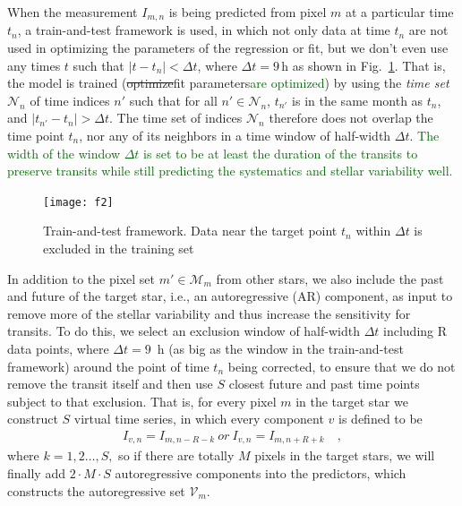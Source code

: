 \documentclass[12pt, preprint]{aastex}
\newcommand{\set}[1]{\mathcal{#1}}
\newcommand{\revise}[1]{\textcolor{darkgreen}{#1}}
\newcommand{\remove}[1]{\sout{#1}}
\begin{document}
When the measurement $I_{m,n}$ is being predicted from pixel $m$ at a particular time $t_n$,
  a train-and-test framework is used, in which not only
  data at time $t_n$ are not used in optimizing the parameters of the regression or fit,
  but we don't even use any times $t$ such that $|t-t_n| < \Delta t$,
  where $\Delta t=9$\,h as shown in Fig.~\ref{train-and-test}.
That is, the model is trained (\remove{optimize}fit parameters\revise{are optimized}) by using the \emph{time set} $\set{N}_n$ of time
  indices $n'$ such that for all $n'\in\set{N}_n$,
  $t_{n'}$ is in the same month as $t_n$,
  and $|t_{n'} - t_n|>\Delta t$.
The time set of indices $\set{N}_n$ therefore does not overlap the time point $t_n$,
  nor any of its neighbors in a time window of half-width $\Delta t$. 
\revise{The width of the window $\Delta t$ is set to be at least the duration of the transits to preserve transits while still predicting the systematics and stellar variability well.}
  
\begin{figure}[p]
\begin{center}
\texttt{[image: f2]}
\end{center}
\caption{
  \label{train-and-test} 
  Train-and-test framework. 
  Data near the target point $t_{n}$ within $\Delta t$ is excluded in the training set}
\end{figure}
  
In addition to the pixel set $m'\in\set{M}_m$ from other stars,  
  we also include the past and future of the target star, i.e., an autoregressive (AR) component, as input 
  to remove more of the stellar variability and thus increase the sensitivity for transits. 
To do this, we select an exclusion window of half-width $\Delta t$ including R data points, 
  where $\Delta t=9$\, h (as big as the window in the train-and-test framework) 
  around the point of time $t_{n}$ being corrected, 
  to ensure that we do not remove the transit itself 
  and then use $S$ closest future and past time points subject to that exclusion. 
That is, for every pixel $m$ in the target star we construct $S$ virtual time series, 
  in which every component $v$ is defined to be     
\begin{eqnarray}
I_{v,n} = I_{m,n-R-k}\ or\ I_{v,n} = I_{m,n+R+k}
\quad,
\end{eqnarray}
where $k = 1, 2\dots, S,$ so if there are totally $M$ pixels in the target stars, 
  we will finally add $2\cdot M\cdot S$
  autoregressive components into the predictors, which constructs the autoregressive set $\set{V}_m$.
\end{document}
